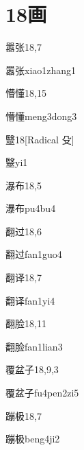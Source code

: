 
\section*{18画}

\begin{entry}{嚣张}{18,7}
  \begin{phonetics}{嚣张}{xiao1zhang1}
  \end{phonetics}
\end{entry}

\begin{entry}{懵懂}{18,15}
  \begin{phonetics}{懵懂}{meng3dong3}
  \end{phonetics}
\end{entry}

\begin{entry}{毉}{18}[Radical 殳]
  \begin{phonetics}{毉}{yi1}
  \end{phonetics}
\end{entry}

\begin{entry}{瀑布}{18,5}
  \begin{phonetics}{瀑布}{pu4bu4}
  \end{phonetics}
\end{entry}

\begin{entry}{翻过}{18,6}
  \begin{phonetics}{翻过}{fan1guo4}
  \end{phonetics}
\end{entry}

\begin{entry}{翻译}{18,7}
  \begin{phonetics}{翻译}{fan1yi4}
  \end{phonetics}
\end{entry}

\begin{entry}{翻脸}{18,11}
  \begin{phonetics}{翻脸}{fan1lian3}
  \end{phonetics}
\end{entry}

\begin{entry}{覆盆子}{18,9,3}
  \begin{phonetics}{覆盆子}{fu4pen2zi5}
  \end{phonetics}
\end{entry}

\begin{entry}{蹦极}{18,7}
  \begin{phonetics}{蹦极}{beng4ji2}
  \end{phonetics}
\end{entry}



